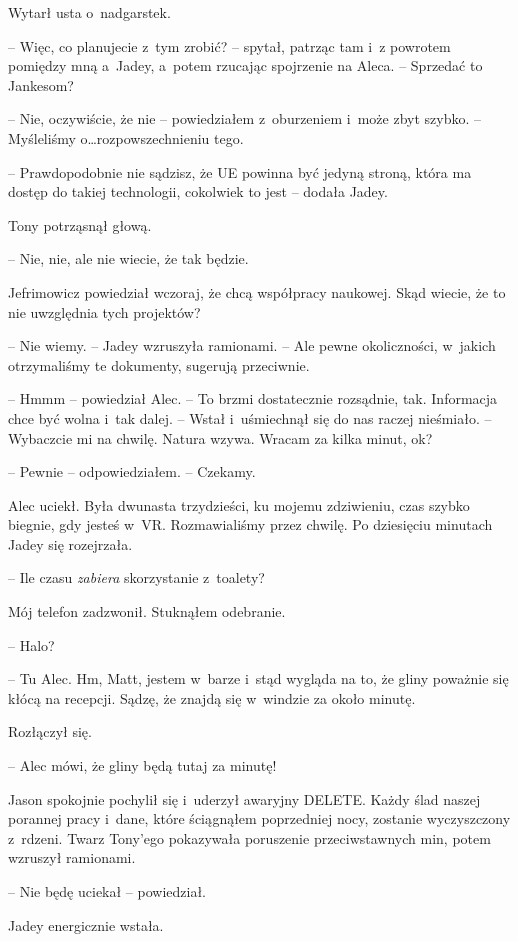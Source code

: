 \documentclass[oneside,polish,12pt,sfheadings]{mwbk}
\begin{document}
Wytarł usta o~nadgarstek.

-- Więc, co planujecie z~tym zrobić? -- spytał, patrząc tam i~z powrotem
pomiędzy mną a~Jadey, a~potem rzucając spojrzenie na Aleca. -- Sprzedać
to Jankesom?

-- Nie, oczywiście, że nie -- powiedziałem z~oburzeniem i~może zbyt
szybko. -- Myśleliśmy o\ldots rozpowszechnieniu tego.

-- Prawdopodobnie nie sądzisz, że UE powinna być jedyną stroną, która ma
dostęp do takiej technologii, cokolwiek to jest -- dodała Jadey.

Tony potrząsnął głową. 

-- Nie, nie, ale nie wiecie, że tak będzie.

Jefrimowicz powiedział wczoraj, że chcą współpracy naukowej. Skąd
wiecie, że to nie uwzględnia tych projektów?

-- Nie wiemy. -- Jadey wzruszyła ramionami. -- Ale pewne okoliczności, w~jakich otrzymaliśmy te dokumenty, sugerują przeciwnie.

-- Hmmm -- powiedział Alec. -- To brzmi dostatecznie rozsądnie, tak.
Informacja chce być wolna i~tak dalej. -- Wstał i~uśmiechnął się do nas
raczej nieśmiało. -- Wybaczcie mi na chwilę. Natura wzywa. Wracam za
kilka minut, ok?

-- Pewnie -- odpowiedziałem. -- Czekamy.

Alec uciekł. Była dwunasta trzydzieści, ku mojemu zdziwieniu, czas szybko biegnie,
gdy jesteś w~VR. Rozmawialiśmy przez chwilę. Po dziesięciu minutach
Jadey się rozejrzała.

-- Ile czasu \emph{zabiera} skorzystanie z~toalety?

Mój telefon zadzwonił. Stuknąłem odebranie.

-- Halo?

-- Tu Alec. Hm, Matt, jestem w~barze i~stąd wygląda na to, że gliny
poważnie się kłócą na recepcji. Sądzę, że znajdą się w~windzie za około
minutę.

Rozłączył się.

-- Alec mówi, że gliny będą tutaj za minutę!

Jason spokojnie pochylił się i~uderzył awaryjny DELETE. Każdy ślad
naszej porannej pracy i~dane, które ściągnąłem poprzedniej nocy,
zostanie wyczyszczony z~rdzeni. Twarz Tony'ego pokazywała poruszenie
przeciwstawnych min, potem wzruszył ramionami.

-- Nie będę uciekał -- powiedział.

Jadey energicznie wstała. 
\end{document}
